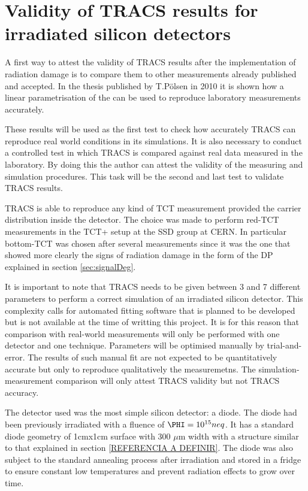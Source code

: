 \chapter{Validity of TRACS results for irradiated silicon detectors}

A first way to attest the validity of TRACS results after the implementation of radiation damage is to compare them to other measurements already published and accepted. In the thesis published by T.P\"{o}lsen in 2010\cite{Pholsen} it is shown how a linear parametrisation of the \neff can be used to reproduce laboratory measurements accurately. 

These results will be used as the first test to check how accurately TRACS can reproduce real world conditions in its simulations. It is also necessary to conduct a controlled test in which TRACS is compared against real data measured in the laboratory. By doing this the author can attest the validity of the measuring and simulation procedures. This task will be the second and last test to validate TRACS results.

TRACS is able to reproduce any kind of TCT measurement provided the carrier distribution inside the detector. The choice was made to perform red-TCT measurements in the TCT+ setup at the SSD group at CERN. In particular bottom-TCT was chosen after several measurements since it was the one that showed more clearly the signs of radiation damage in the form of the DP explained in section \ref{sec:signalDeg}. 

It is important to note that TRACS needs to be given between 3 and 7 different parameters to perform a correct simulation of an irradiated silicon detector. This complexity calls for automated fitting software that is planned to be developed but is not available at the time of writting this project.
It is for this reason that comparison with real-world measurements will only be performed with one detector and one technique. Parameters will be optimised manually by trial-and-error. The results of such manual fit are not expected to be quantitatively accurate but only to reproduce qualitatively the measuremetns. The simulation-measurement comparison will only attest TRACS validity but not TRACS accuracy.

The detector used was the most simple silicon detector: a diode. The diode had been previously irradiated with a fluence of $\PHI = 10^{15} neq$. It has a standard diode geometry of 1cmx1cm surface with 300 $\mu$m width with a structure similar to that explained in section \ref{REFERENCIA A DEFINIR}. The diode was also subject to the standard annealing process after irradiation and stored in a fridge to ensure constant low temperatures and prevent radiation effects to grow over time. 

